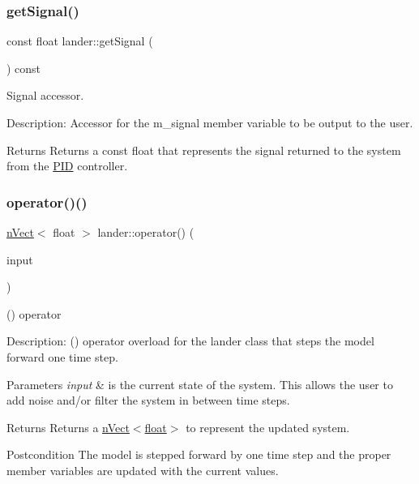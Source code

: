 \subsubsection{\texorpdfstring{get\+Signal()}{getSignal()}}
{\footnotesize\ttfamily const float lander\+::get\+Signal (\begin{DoxyParamCaption}{ }\end{DoxyParamCaption}) const}



Signal accessor. 

Description\+: Accessor for the m\+\_\+signal member variable to be output to the user. \begin{DoxyReturn}{Returns}
Returns a const float that represents the signal returned to the system from the \hyperlink{classPID}{P\+ID} controller. 
\end{DoxyReturn}
\mbox{\label{classlander_a2fe992a7fb65bbcc59c9ce929c9a6069}} 
\subsubsection{\texorpdfstring{operator()()}{operator()()}}
{\footnotesize\ttfamily \hyperlink{classnVect}{n\+Vect}$<$ float $>$ lander\+::operator() (\begin{DoxyParamCaption}\item[{const \hyperlink{classnVect}{n\+Vect}$<$ float $>$ \&}]{input }\end{DoxyParamCaption})}



() operator 

Description\+: () operator overload for the lander class that steps the model forward one time step. 
\begin{DoxyParams}{Parameters}
{\em input} & is the current state of the system. This allows the user to add noise and/or filter the system in between time steps. \\
\hline
\end{DoxyParams}
\begin{DoxyReturn}{Returns}
Returns a \hyperlink{classnVect}{n\+Vect$<$float$>$} to represent the updated system. 
\end{DoxyReturn}
\begin{DoxyPostcond}{Postcondition}
The model is stepped forward by one time step and the proper member variables are updated with the current values. 
\end{DoxyPostcond}
\mbox{\label{classlander_af3b77c442d0872e00520a66f771cc477}} 
